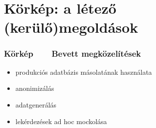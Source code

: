 \documentclass[
]{beamer}
\newcommand{\slidetitle}[2]{\frametitle{{\small #1 ~ \ding{226} ~ } \normalsize \textbf{#2} }}
\begin{document}
\section{Körkép: a létező (kerülő)megoldások}
\def\sectionshorttitle{Körkép}

\begin{frame}
    \slidetitle{\sectionshorttitle}{Bevett megközelítések}
    
    \begin{itemize}
        \setlength\itemsep{1.5em}
        \item produkciós adatbázis másolatának használata
        \item anonimizálás
        \item adatgenerálás
        \item lekérdezések ad hoc mockolása
    \end{itemize}
\end{frame}
\end{document}
